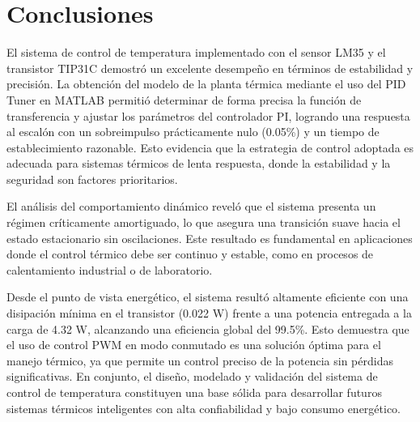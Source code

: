 \section{Conclusiones}

El sistema de control de temperatura implementado con el sensor LM35 y el transistor TIP31C demostró un excelente desempeño en términos de estabilidad y precisión. La obtención del modelo de la planta térmica mediante el uso del PID Tuner en MATLAB permitió determinar de forma precisa la función de transferencia y ajustar los parámetros del controlador PI, logrando una respuesta al escalón con un sobreimpulso prácticamente nulo (0.05\%) y un tiempo de establecimiento razonable. Esto evidencia que la estrategia de control adoptada es adecuada para sistemas térmicos de lenta respuesta, donde la estabilidad y la seguridad son factores prioritarios.

El análisis del comportamiento dinámico reveló que el sistema presenta un régimen críticamente amortiguado, lo que asegura una transición suave hacia el estado estacionario sin oscilaciones. Este resultado es fundamental en aplicaciones donde el control térmico debe ser continuo y estable, como en procesos de calentamiento industrial o de laboratorio.

Desde el punto de vista energético, el sistema resultó altamente eficiente con una disipación mínima en el transistor (0.022 W) frente a una potencia entregada a la carga de 4.32 W, alcanzando una eficiencia global del 99.5\%. Esto demuestra que el uso de control PWM en modo conmutado es una solución óptima para el manejo térmico, ya que permite un control preciso de la potencia sin pérdidas significativas. En conjunto, el diseño, modelado y validación del sistema de control de temperatura constituyen una base sólida para desarrollar futuros sistemas térmicos inteligentes con alta confiabilidad y bajo consumo energético.